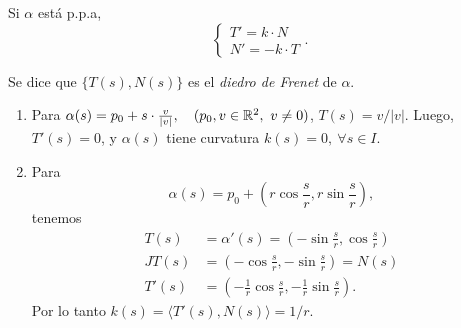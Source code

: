 \begin{prop}
	Si $\alpha$ está p.p.a,
	\[ \begin{cases}
		T' = k \cdot N \\
		N' = -k \cdot T
	\end{cases}. \]
\end{prop}

\begin{definition}
	Se dice que $\{T(s), N(s)\}$ es el \textit{diedro de Frenet} de $\alpha$. 
\end{definition}

\begin{eg}
	\begin{enumerate}
		\item Para $\alpha(s) = p_{0} + s \cdot \frac{v}{|v|}, \quad (p_{0},v \in \mathbb{R}^{2},\ v \neq 0)$, $T(s) = v \slash |v|$. Luego, $T'(s) = 0$, y $\alpha(s)$ tiene curvatura $k(s) = 0,\ \forall s \in I$.

		\item Para 
		\[ \alpha(s) = p_{0} + \left( r \cos \frac{s}{r}, r \sin \frac{s}{r} \right), \]
		tenemos
		\begin{align*}
			T(s) &= \alpha'(s) = \left( -\sin \frac{s}{r}, \cos \frac{s}{r} \right) \\
			JT(s) &= \left( -\cos \frac{s}{r}, -\sin \frac{s}{r} \right) = N(s) \\
			T'(s) &= \left( -\frac{1}{r} \cos \frac{s}{r}, -\frac{1}{r} \sin \frac{s}{r} \right).
		\end{align*}
		Por lo tanto $k(s) = \langle T'(s), N(s) \rangle = 1 \slash r$.
	\end{enumerate}
\end{eg}

